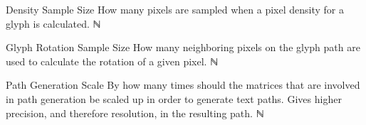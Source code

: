 \begin{itemize}
{\begin{itemize}
      \paritem
      {Density Sample Size}
      {How many pixels are sampled when a pixel density for a glyph is calculated.}
      {ℕ}
      {\DnsSampleParSymbol}

      \paritem
      {Glyph Rotation Sample Size}
      {How many neighboring pixels on the glyph path are used to calculate the rotation of a given pixel.}
      {ℕ}
      {\GlyphRotParSymbol}

      \paritem
      {Path Generation Scale}
      {By how many times should the matrices that are involved in path generation be scaled up in order to generate text paths.
        Gives higher precision, and therefore resolution, in the resulting path.}
      {ℕ}
      {\PathGenSclParSymbol}

    \end{itemize}
  }
\end{itemize}